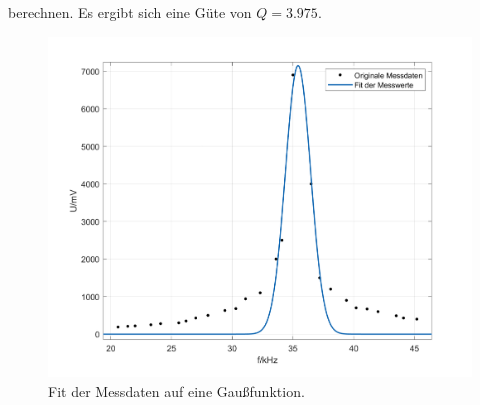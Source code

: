\documentclass[a4paper]{scrartcl}
\begin{document}
berechnen. Es ergibt sich eine Güte von $Q=3.975$.
\begin{figure}[H]
  \centering
  \includegraphics[width=12cm]{fit.png}
  \caption{Fit der Messdaten auf eine Gaußfunktion.}
\end{figure}
\end{document}
